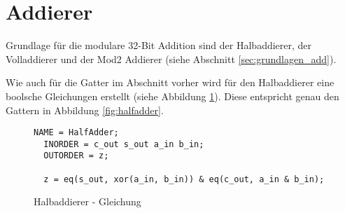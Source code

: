 \section{Addierer}
\label{sec:knf:addierer}

Grundlage für die modulare 32-Bit Addition sind der Halbaddierer, der Volladdierer und der Mod2 Addierer (siehe Abschnitt \ref{sec:grundlagen_add}).

Wie auch für die Gatter im Abschnitt vorher wird für den Halbaddierer eine boolsche Gleichungen erstellt (siehe Abbildung \ref{fig:halfadder_eqn}).
Diese entspricht genau den Gattern in Abbildung \ref{fig:halfadder}.
\begin{figure}[!h]
  \centering
  \begin{lstlisting}[]
  NAME = HalfAdder;
  INORDER = c_out s_out a_in b_in;
  OUTORDER = z;

  z = eq(s_out, xor(a_in, b_in)) & eq(c_out, a_in & b_in);
  \end{lstlisting}
  \caption{Halbaddierer - Gleichung}
  \label{fig:halfadder_eqn}
\end{figure}

